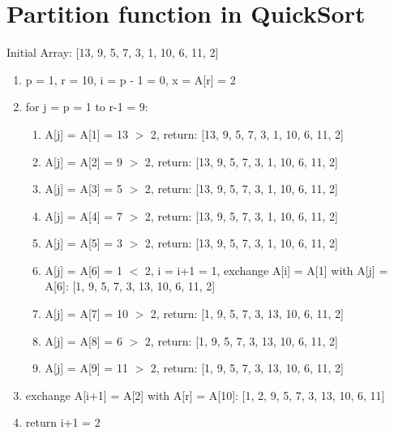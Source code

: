 \documentclass[12pt]{article}
\begin{document}
\section{Partition function in QuickSort}
Initial Array: [13, 9, 5, 7, 3, 1, 10, 6, 11, 2]
\begin{enumerate}
    \item p = 1, r = 10, i = p - 1 = 0, x = A[r] = 2
    \item for j = p = 1 to r-1 = 9: \begin{enumerate}
        \item A[j] = A[1] = 13 $>$ 2, return: [{\color{red}13}, 9, 5, 7, 3, 1, 10, 6, 11, {\color{blue}2}]
        \item A[j] = A[2] = 9 $>$ 2, return: [{\color{red}13, 9}, 5, 7, 3, 1, 10, 6, 11, {\color{blue}2}]
        \item A[j] = A[3] = 5 $>$ 2, return: [{\color{red}13, 9, 5}, 7, 3, 1, 10, 6, 11, {\color{blue}2}]
        \item A[j] = A[4] = 7 $>$ 2, return: [{\color{red}13, 9, 5, 7}, 3, 1, 10, 6, 11, {\color{blue}2}]
        \item A[j] = A[5] = 3 $>$ 2, return: [{\color{red}13, 9, 5, 7, 3}, 1, 10, 6, 11, {\color{blue}2}]
        \item A[j] = A[6] = 1 $<$ 2, i = i+1 = 1, exchange A[i] = A[1] with A[j] = A[6]: [{\color{green}1}, {\color{red}9, 5, 7, 3, 13}, 10, 6, 11, {\color{blue}2}]
        \item A[j] = A[7] = 10 $>$ 2, return: [{\color{green}1}, {\color{red}9, 5, 7, 3, 13, 10}, 6, 11, {\color{blue}2}]
        \item A[j] = A[8] = 6 $>$ 2, return: [{\color{green}1}, {\color{red}9, 5, 7, 3, 13, 10, 6}, 11, {\color{blue}2}]
        \item A[j] = A[9] = 11 $>$ 2, return: [{\color{green}1}, {\color{red}9, 5, 7, 3, 13, 10, 6, 11}, {\color{blue}2}]
    \end{enumerate}
    \item exchange A[i+1] = A[2] with A[r] = A[10]: [{\color{green}1}, {\color{blue}2}, {\color{red}9, 5, 7, 3, 13, 10, 6, 11}]
    \item return i+1 = 2
\end{enumerate}
\end{document}
